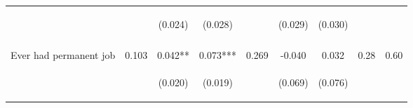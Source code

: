 \begin{tabular}{lcccccccc}
 & \begin{footnotesize}\end{footnotesize} & \begin{footnotesize}(0.024)\end{footnotesize} & \begin{footnotesize}(0.028)\end{footnotesize} & \begin{footnotesize}\end{footnotesize} & \begin{footnotesize}(0.029)\end{footnotesize} & \begin{footnotesize}(0.030)\end{footnotesize} & \begin{footnotesize}\end{footnotesize} & \begin{footnotesize}\end{footnotesize}\\
 & \begin{footnotesize}\end{footnotesize} & \begin{footnotesize}[0.076]\end{footnotesize} & \begin{footnotesize}[0.003]\end{footnotesize} & \begin{footnotesize}\end{footnotesize} & \begin{footnotesize}[1.000]\end{footnotesize} & \begin{footnotesize}[0.087]\end{footnotesize} & \begin{footnotesize}\end{footnotesize} & \begin{footnotesize}\end{footnotesize}\\
\noalign{\smallskip}Ever had permanent job & 0.103 & 0.042** & 0.073*** & 0.269 & -0.040 & 0.032 & 0.28 & 0.60\\
 & \begin{footnotesize}\end{footnotesize} & \begin{footnotesize}(0.020)\end{footnotesize} & \begin{footnotesize}(0.019)\end{footnotesize} & \begin{footnotesize}\end{footnotesize} & \begin{footnotesize}(0.069)\end{footnotesize} & \begin{footnotesize}(0.076)\end{footnotesize} & \begin{footnotesize}\end{footnotesize} & \begin{footnotesize}\end{footnotesize}\\

\end{tabular}
